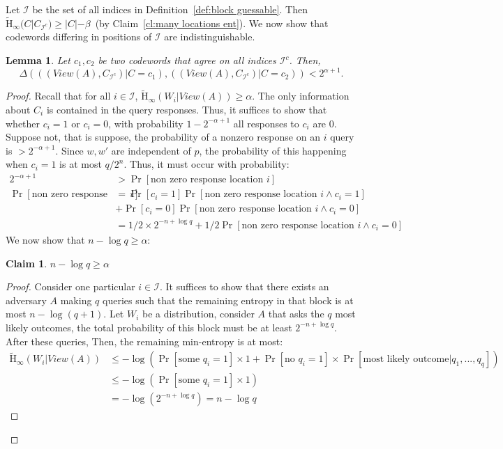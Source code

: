 \documentclass[11pt]{article}
\newcommand{\defref}[1]{\mbox{Definition~\ref{#1}}}
\newcommand{\clref}[1]{\mbox{Claim~\ref{#1}}}
\newcommand{\Hav}{\tilde{\mathrm{H}}_\infty}
\newtheorem{lemma}[theorem]{Lemma}
\newtheorem{claim}[theorem]{Claim}
\begin{document}
Let $\mathcal{I}$ be the set of all indices in \defref{def:block guessable}.  Then $\Hav(C | C_{\mathcal{I}^c}) \geq |C| - \beta$~(by \clref{cl:many locations ent}).  We now show that codewords differing in positions of $\mathcal{I}$ are indistinguishable.
\begin{lemma}
\label{lem:codewords in I close}
Let $c_1, c_2$ be two codewords that agree on all indices $\mathcal{I}^c$.  Then, 
\[
\Delta( ((View(A), C_{\mathcal{I}^c} )| C = c_1),( (View(A), C_{\mathcal{I}^c})  | C= c_2)) < 2^{\alpha+1}.
\]
\end{lemma}
\begin{proof}
Recall that for all $i\in \mathcal{I}$, $\Hav(W_i | View(A))\geq \alpha$.  The only information about $C_i$ is contained in the query responses.  Thus, it suffices to show that whether $c_i= 1$ or $c_i=0$, with probability $1-2^{-\alpha+1}$ all responses to $c_i$ are $0$.  Suppose not, that is suppose, the probability of a nonzero response on an $i$ query is $>2^{-\alpha+1}$.  Since $w, w'$ are independent of $p$, the probability of this happening when $c_i = 1$ is at most $q/2^n$.  Thus, it must occur with probability:
\begin{align*}
2^{-\alpha+1}&>\Pr[\text{non zero response location }i]\\
\Pr[\text{non zero response location }i] &= \Pr[c_i =1]\Pr[\text{non zero response location }i\wedge c_i=1] \\&+ \Pr[c_i=0] \Pr[\text{non zero response location }i \wedge c_i=0]\\
&=1/2 \times 2^{-n+\log q} + 1/2 \Pr[\text{non zero response location }i \wedge c_i=0]
\end{align*}
We now show that $n-\log q \geq \alpha$:
\begin{claim}
$n-\log q \geq \alpha$
\end{claim}
\begin{proof}
Consider one particular $i \in \mathcal{I}$.  It suffices to show that there exists an adversary $A$ making $q$ queries such that the remaining entropy in that block is at most $n-\log (q+1)$.  Let $W_i$ be a distribution, consider $A$ that asks the $q$ most likely outcomes, the total probability of this block must be at least $2^{-n+\log q}$.  After these queries, Then, the remaining min-entropy is at most:
\begin{align*}
\Hav(W_i | View(A)) &\leq  -\log \left(\Pr[\text{some }q_i=1]\times 1+ \Pr[\text{no }q_i=1]\times \Pr[\text{most likely outcome}|q_1,...,q_q]\right)\\
&\leq  -\log \left(\Pr[\text{some }q_i=1]\times 1\right)\\
&=-\log\left( 2^{-n+\log q} \right) = n-\log q
\end{align*}
\end{proof}


\end{proof}
\end{document}
